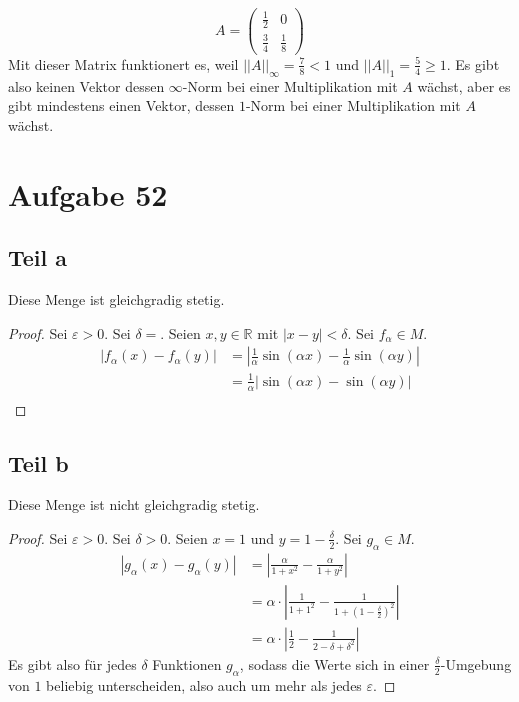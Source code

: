 \documentclass[10pt,a4paper]{article}
\begin{document}
\begin{equation}
A = \begin{pmatrix}
\frac{1}{2} & 0\\
\frac{3}{4} & \frac{1}{8}
\end{pmatrix}
\end{equation}
Mit dieser Matrix funktionert es, weil $||A||_{\infty} = \frac{7}{8} < 1$ und $||A||_{1} = \frac{5}{4} \ge 1$.
Es gibt also keinen Vektor dessen $\infty$-Norm bei einer Multiplikation mit $A$ wächst, aber es gibt mindestens einen Vektor, dessen $1$-Norm bei einer Multiplikation mit $A$ wächst.

\section*{Aufgabe 52}

\subsection*{Teil a}

Diese Menge ist gleichgradig stetig.

\begin{proof}
Sei $\varepsilon > 0$.
Sei $\delta = $.
Seien $x, y \in \mathbb{R}$ mit $|x - y| < \delta$.
Sei $f_{\alpha} \in M$.
\begin{align*}
|f_{\alpha}(x) - f_{\alpha}(y)| & = |\frac{1}{\alpha}\sin(\alpha x) - \frac{1}{\alpha}\sin(\alpha y)|\\
& = \frac{1}{\alpha}|\sin(\alpha x) - \sin(\alpha y)|\\
\end{align*}
\end{proof}

\subsection*{Teil b}

Diese Menge ist nicht gleichgradig stetig.

\begin{proof}
Sei $\varepsilon > 0$.
Sei $\delta > 0$.
Seien $x = 1$ und $y = 1 - \frac{\delta}{2}$.
Sei $g_{\alpha} \in M$.
\begin{align*}
|g_{\alpha}(x) - g_{\alpha}(y)| & = |\frac{\alpha}{1 + x^{2}} - \frac{\alpha}{1 + y^{2}}|\\
& = \alpha \cdot |\frac{1}{1 + 1^{2}} - \frac{1}{1 + (1 - \frac{\delta}{2})^{2}}|\\
& = \alpha \cdot |\frac{1}{2} - \frac{1}{2 - \delta + \delta^{2}}|
\end{align*}
Es gibt also für jedes $\delta$ Funktionen $g_{\alpha}$, sodass die Werte sich in einer $\frac{\delta}{2}$-Umgebung von $1$ beliebig unterscheiden, also auch um mehr als jedes $\varepsilon$.
\end{proof}
\end{document}
